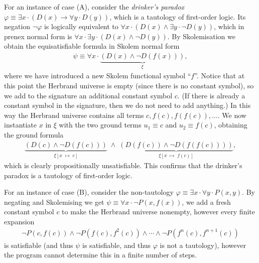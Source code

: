 \documentclass[zad,zawodnik,en]{sinol}
\begin{document}
    For an instance of case (A),
    consider the \emph{drinker's paradox}
    $\varphi \equiv \exists x \cdot (D(x) \to \forall y \cdot D(y))$,
    which is a tautology of first-order logic.
    Its negation $\neg \varphi$ is logically equivalent to
    $\forall x \cdot (D(x) \land \exists y \cdot \neg D(y))$,
    which in prenex normal form is $\forall x \cdot \exists y \cdot (D(x) \land \neg D(y))$.
    By Skolemisation we obtain the equisatisfiable formula in Skolem normal form
    \begin{align*}
      \psi \equiv \forall x \cdot \underbrace{(D(x) \land \neg D(f(x)))}_{\xi},
    \end{align*}
    where we have introduced a new Skolem functional symbol ``$f$''.
    Notice that at this point the Herbrand universe is empty (since there is no constant symbol),
    so we add to the signature an additional constant symbol $c$.
    (If there is already a constant symbol in the signature, then we do not need to add anything.)
    In this way the Herbrand universe contains all terms $c, f(c), f(f(c)), \dots$.
    We now instantiate $x$ in $\xi$ with the two ground terms $u_1 \equiv c$ and $u_2 \equiv f(c)$,
    obtaining the ground formula
    \begin{align*}
      \underbrace{(D(c) \land \neg D(f(c)))}_{\xi[x \;\mapsto\; c]} \;\land\;
      \underbrace{(D(f(c)) \land \neg D(f(f(c))))}_{\xi[x \;\mapsto\; f(c)]},
    \end{align*}
    which is clearly propositionally unsatisfiable.
    This confirms that the drinker's paradox is a tautology of first-order logic.

    For an instance of case (B), consider the non-tautology
    $\varphi \equiv \exists x \cdot \forall y \cdot P(x, y)$.
    By negating and Skolemising we get $\psi \equiv \forall x \cdot \neg P(x, f(x))$, we add a fresh constant symbol $c$ to make the Herbrand universe nonempty,
    however every finite expansion
    \begin{align*}
      \neg P(c, f(c)) \land \neg P(f(c), f^2(c)) \land \cdots \land \neg P(f^n(c), f^{n+1}(c))
    \end{align*}
    is satisfiable (and thus $\psi$ is satisfiable, and thus $\varphi$ is not a tautology),
    however the program cannot determine this in a finite number of steps.
\end{document}
